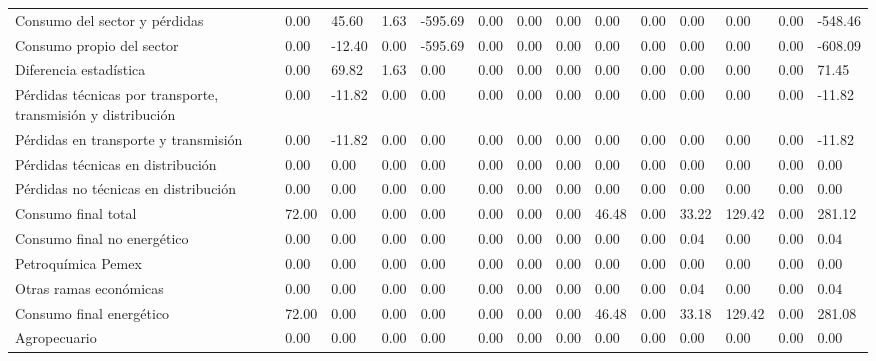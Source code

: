 \documentclass{sener2025}
\begin{document}
\begin{tabladoradoLargo}
\begin{xltabular}{\textwidth}{QZZZZZZZZZZZZZ}
    Consumo del sector y pérdidas & 0.00 & 45.60 & 1.63 & -595.69 & 0.00 & 0.00 & 0.00 & 0.00 & 0.00 & 0.00 & 0.00 & 0.00 & -548.46 \\
    \hspace{1.35em} Consumo propio del sector & 0.00 & -12.40 & 0.00 & -595.69 & 0.00 & 0.00 & 0.00 & 0.00 & 0.00 & 0.00 & 0.00 & 0.00 & -608.09 \\
    \hspace{1.35em} Diferencia estadística & 0.00 & 69.82 & 1.63 & 0.00 & 0.00 & 0.00 & 0.00 & 0.00 & 0.00 & 0.00 & 0.00 & 0.00 & 71.45 \\
    \hspace{1.35em} Pérdidas técnicas por transporte, transmisión y distribución & 0.00 & -11.82 & 0.00 & 0.00 & 0.00 & 0.00 & 0.00 & 0.00 & 0.00 & 0.00 & 0.00 & 0.00 & -11.82 \\
    \hspace{2.7em} Pérdidas en transporte y transmisión & 0.00 & -11.82 & 0.00 & 0.00 & 0.00 & 0.00 & 0.00 & 0.00 & 0.00 & 0.00 & 0.00 & 0.00 & -11.82 \\
    \hspace{2.7em} Pérdidas técnicas en distribución & 0.00 & 0.00 & 0.00 & 0.00 & 0.00 & 0.00 & 0.00 & 0.00 & 0.00 & 0.00 & 0.00 & 0.00 & 0.00 \\
    \hspace{2.7em} Pérdidas no técnicas  en distribución & 0.00 & 0.00 & 0.00 & 0.00 & 0.00 & 0.00 & 0.00 & 0.00 & 0.00 & 0.00 & 0.00 & 0.00 & 0.00 \\
    Consumo final total & 72.00 & 0.00 & 0.00 & 0.00 & 0.00 & 0.00 & 0.00 & 46.48 & 0.00 & 33.22 & 129.42 & 0.00 & 281.12 \\
    \hspace{1.35em} Consumo final no energético & 0.00 & 0.00 & 0.00 & 0.00 & 0.00 & 0.00 & 0.00 & 0.00 & 0.00 & 0.04 & 0.00 & 0.00 & 0.04 \\
    \hspace{2.7em} Petroquímica Pemex & 0.00 & 0.00 & 0.00 & 0.00 & 0.00 & 0.00 & 0.00 & 0.00 & 0.00 & 0.00 & 0.00 & 0.00 & 0.00 \\
    \hspace{2.7em} Otras ramas económicas & 0.00 & 0.00 & 0.00 & 0.00 & 0.00 & 0.00 & 0.00 & 0.00 & 0.00 & 0.04 & 0.00 & 0.00 & 0.04 \\
    Consumo final energético & 72.00 & 0.00 & 0.00 & 0.00 & 0.00 & 0.00 & 0.00 & 46.48 & 0.00 & 33.18 & 129.42 & 0.00 & 281.08 \\
    \hspace{2.7em} Agropecuario & 0.00 & 0.00 & 0.00 & 0.00 & 0.00 & 0.00 & 0.00 & 0.00 & 0.00 & 0.00 & 0.00 & 0.00 & 0.00 \\

\end{xltabular}
\end{tabladoradoLargo}
\end{document}
